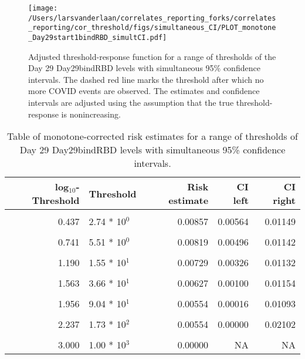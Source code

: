 \documentclass[]{article}
\begin{document}
\begin{figure}[H]
\centering
\texttt{[image: /Users/larsvanderlaan/correlates\_reporting\_forks/correlates\_reporting/cor\_threshold/figs/simultaneous\_CI/PLOT\_monotone\_Day29start1bindRBD\_simultCI.pdf]}
\caption{Adjusted threshold-response function for a range of thresholds of the
  Day 29 Day29bindRBD levels with simultaneous 95\% confidence intervals. The dashed red line marks the threshold after which no more COVID events are observed. The estimates and confidence intervals are adjusted using the assumption that the true threshold-response is nonincreasing.}
\end{figure}
\begin{table}[!h]

\caption{\label{tab:unnamed-chunk-65}Table of monotone-corrected risk estimates for a range of thresholds of Day 29 Day29bindRBD levels with simultaneous 95\% confidence intervals.}
\centering
\begin{tabular}[t]{rlrrr}
\toprule
log$_{10}$-Threshold & Threshold & Risk estimate & CI left & CI right\\
\midrule
\cellcolor{gray!6}{-0.099} & \cellcolor{gray!6}{7.96 * 10$^{1}$} & \cellcolor{gray!6}{0.00876} & \cellcolor{gray!6}{0.00598} & \cellcolor{gray!6}{0.01154}\\
0.437 & 2.74 * 10$^{0}$ & 0.00857 & 0.00564 & 0.01149\\
\cellcolor{gray!6}{0.585} & \cellcolor{gray!6}{3.85 * 10$^{0}$} & \cellcolor{gray!6}{0.00857} & \cellcolor{gray!6}{0.00544} & \cellcolor{gray!6}{0.01169}\\
0.741 & 5.51 * 10$^{0}$ & 0.00819 & 0.00496 & 0.01142\\
\cellcolor{gray!6}{1.000} & \cellcolor{gray!6}{1.00 * 10$^{1}$} & \cellcolor{gray!6}{0.00788} & \cellcolor{gray!6}{0.00450} & \cellcolor{gray!6}{0.01126}\\
1.190 & 1.55 * 10$^{1}$ & 0.00729 & 0.00326 & 0.01132\\
\cellcolor{gray!6}{1.371} & \cellcolor{gray!6}{2.35 * 10$^{1}$} & \cellcolor{gray!6}{0.00671} & \cellcolor{gray!6}{0.00219} & \cellcolor{gray!6}{0.01122}\\
1.563 & 3.66 * 10$^{1}$ & 0.00627 & 0.00100 & 0.01154\\
\cellcolor{gray!6}{1.852} & \cellcolor{gray!6}{7.11 * 10$^{1}$} & \cellcolor{gray!6}{0.00621} & \cellcolor{gray!6}{0.00012} & \cellcolor{gray!6}{0.01229}\\
1.956 & 9.04 * 10$^{1}$ & 0.00554 & 0.00016 & 0.01093\\
\cellcolor{gray!6}{2.083} & \cellcolor{gray!6}{1.21 * 10$^{2}$} & \cellcolor{gray!6}{0.00554} & \cellcolor{gray!6}{0.00000} & \cellcolor{gray!6}{0.02102}\\
2.237 & 1.73 * 10$^{2}$ & 0.00554 & 0.00000 & 0.02102\\
\cellcolor{gray!6}{2.699} & \cellcolor{gray!6}{5.00 * 10$^{2}$} & \cellcolor{gray!6}{0.00000} & \cellcolor{gray!6}{NA} & \cellcolor{gray!6}{NA}\\
3.000 & 1.00 * 10$^{3}$ & 0.00000 & NA & NA\\
\bottomrule
\end{tabular}
\end{table}
\end{document}
